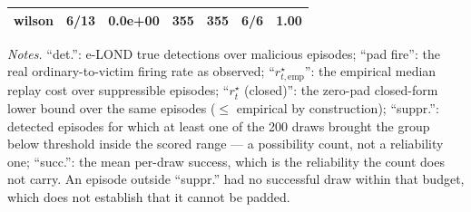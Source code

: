 \begin{table}[t]
{\begin{tabular}{lrrrrrr}
wilson & 6/13 & 0.0e+00 & 355 & 355 & 6/6 & 1.00 \\
\bottomrule
\end{tabular}}
\par\vspace{3pt}
{\footnotesize\raggedright \emph{Notes.} ``det.'': e-LOND true detections over malicious episodes; ``pad
fire'': the real ordinary-to-victim firing rate as observed; ``$r^{\star}_{t,\mathrm{emp}}$'': the empirical median
replay cost over suppressible episodes; ``$r^{\star}_t$ (closed)'': the zero-pad closed-form lower bound over
the same episodes ($\le$ empirical by construction); ``suppr.'': detected episodes for which at least
one of the 200 draws brought the group below threshold inside the scored range --- a
possibility count, not a reliability one; ``succ.'': the mean per-draw success, which is the
reliability the count does not carry. An episode outside ``suppr.'' had no successful draw within that
budget, which does not establish that it cannot be padded.\par}
\end{table}
